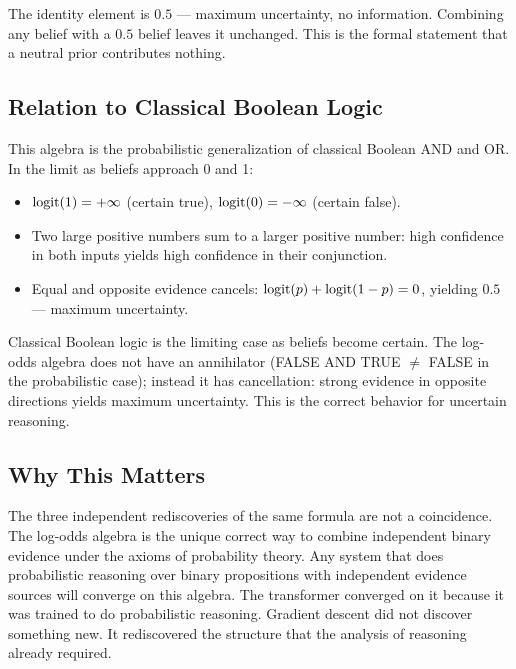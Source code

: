 The identity element is $0.5$ --- maximum uncertainty, no information. Combining any belief with a $0.5$ belief leaves it unchanged. This is the formal statement that a neutral prior contributes nothing.

\subsection*{Relation to Classical Boolean Logic}

This algebra is the probabilistic generalization of classical Boolean AND and OR. In the limit as beliefs approach 0 and 1:
\begin{itemize}
\item $\operatorname{logit}(1) = +\infty$ (certain true), $\operatorname{logit}(0) = -\infty$ (certain false).
\item Two large positive numbers sum to a larger positive number: high confidence in both inputs yields high confidence in their conjunction.
\item Equal and opposite evidence cancels: $\operatorname{logit}(p) + \operatorname{logit}(1-p) = 0$, yielding $0.5$ --- maximum uncertainty.
\end{itemize}

Classical Boolean logic is the limiting case as beliefs become certain. The log-odds algebra does not have an annihilator (FALSE AND TRUE $\neq$ FALSE in the probabilistic case); instead it has cancellation: strong evidence in opposite directions yields maximum uncertainty. This is the correct behavior for uncertain reasoning.

\subsection*{Why This Matters}

The three independent rediscoveries of the same formula are not a coincidence. The log-odds algebra is the unique correct way to combine independent binary evidence under the axioms of probability theory. Any system that does probabilistic reasoning over binary propositions with independent evidence sources will converge on this algebra. The transformer converged on it because it was trained to do probabilistic reasoning. Gradient descent did not discover something new. It rediscovered the structure that the analysis of reasoning already required.